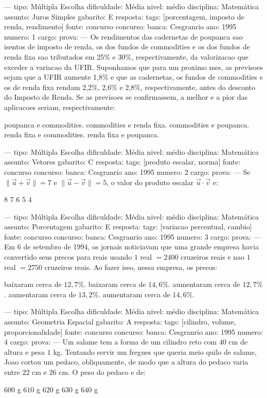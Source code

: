 ---
tipo: Múltipla Escolha
dificuldade: Média
nivel: médio
disciplina: Matemática
assunto: Juros Simples
gabarito: E
resposta:
tags: [porcentagem, imposto de renda, rendimento]
fonte: concurso
concurso:
banca: Cesgranrio
ano: 1995
numero: 1
cargo:
prova:
---
\question
Os rendimentos das cadernetas de poupanca sao isentos de imposto de renda, os dos fundos de commodities e os dos fundos de renda fixa sao tributados em 25\% e 30\%, respectivamente, da valorizacao que exceder a variacao da UFIR. Suponhamos que para um proximo mes, as previsoes sejam que a UFIR aumente 1,8\% e que as cadernetas, os fundos de commodities e os de renda fixa rendam 2,2\%, 2,6\% e 2,8\%, respectivamente, antes do desconto do Imposto de Renda. Se as previsoes se confirmassem, a melhor e a pior das aplicacoes seriam, respectivamente:
\begin{choices}
\choice poupanca e commodities.
\choice commodities e renda fixa.
\choice commodities e poupanca.
\choice renda fixa e commodities.
\CorrectChoice renda fixa e poupanca.
\end{choices}

---
tipo: Múltipla Escolha
dificuldade: Média
nivel: médio
disciplina: Matemática
assunto: Vetores
gabarito: C
resposta:
tags: [produto escalar, norma]
fonte: concurso
concurso:
banca: Cesgranrio
ano: 1995
numero: 2
cargo:
prova:
---
\question
Se $\lVert \vec{u} + \vec{v} \rVert = 7$ e $\lVert \vec{u} - \vec{v} \rVert = 5$, o valor do produto escalar $\vec{u} \cdot \vec{v}$ e:
\begin{choices}
\choice $8$
\choice $7$
\CorrectChoice $6$
\choice $5$
\choice $4$
\end{choices}

---
tipo: Múltipla Escolha
dificuldade: Média
nivel: médio
disciplina: Matemática
assunto: Porcentagem
gabarito: E
resposta:
tags: [variacao percentual, cambio]
fonte: concurso
concurso:
banca: Cesgranrio
ano: 1995
numero: 3
cargo:
prova:
---
\question
Em 6 de setembro de 1994, os jornais noticiavam que uma grande empresa havia convertido seus precos para reais usando $1$ real $= 2400$ cruzeiros reais e nao $1$ real $= 2750$ cruzeiros reais. Ao fazer isso, nessa empresa, os precos:
\begin{choices}
\choice baixaram cerca de $12,7\%$.
\choice baixaram cerca de $14,6\%$.
\choice aumentaram cerca de $12,7\%$.
\choice aumentaram cerca de $13,2\%$.
\CorrectChoice aumentaram cerca de $14,6\%$.
\end{choices}

---
tipo: Múltipla Escolha
dificuldade: Média
nivel: médio
disciplina: Matemática
assunto: Geometria Espacial
gabarito: A
resposta:
tags: [cilindro, volume, proporcionalidade]
fonte: concurso
concurso:
banca: Cesgranrio
ano: 1995
numero: 4
cargo:
prova:
---
\question
Um salame tem a forma de um cilindro reto com $40$ cm de altura e pesa $1$ kg. Tentando servir um fregues que queria meio quilo de salame, Joao cortou um pedaco, obliquamente, de modo que a altura do pedaco varia entre $22$ cm e $26$ cm. O peso do pedaco e de:
\begin{choices}
\CorrectChoice $600$ g
\choice $610$ g
\choice $620$ g
\choice $630$ g
\choice $640$ g
\end{choices}

